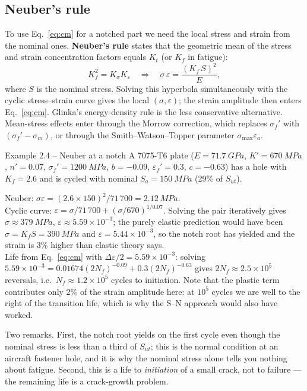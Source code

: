 \documentclass[11pt,a4paper]{article}
\begin{document}
\subsection{Neuber's rule}
To use Eq.~\eqref{eq:cm} for a notched part we need the local stress and strain from the nominal ones. \textbf{Neuber's rule} states that the geometric mean of the stress and strain concentration factors equals $K_t$ (or $K_f$ in fatigue):
\begin{equation}
  K_f^{2}=K_\sigma K_\varepsilon \quad\Longrightarrow\quad
  \sigma\,\varepsilon=\frac{(K_f\,S)^{2}}{E},
\end{equation}
where $S$ is the nominal stress. Solving this hyperbola simultaneously with the cyclic stress--strain curve gives the local $(\sigma,\varepsilon)$; the strain amplitude then enters Eq.~\eqref{eq:cm}. Glinka's energy-density rule is the less conservative alternative. Mean-stress effects enter through the Morrow correction, which replaces $\sigma_f'$ with $(\sigma_f'-\sigma_m)$, or through the Smith--Watson--Topper parameter $\sigma_{\max}\varepsilon_a$.

\begin{examplebox}{Example 2.4 -- Neuber at a notch}
A 7075-T6 plate ($E=\SI{71.7}{GPa}$, $K'=\SI{670}{MPa}$, $n'=0.07$, $\sigma_f'=\SI{1200}{MPa}$, $b=-0.09$, $\varepsilon_f'=0.3$, $c=-0.63$) has a hole with $K_f=2.6$ and is cycled with nominal $S_a=\SI{150}{MPa}$ (29\% of $S_{ut}$).

Neuber: $\sigma\varepsilon=(2.6\times150)^{2}/71\,700=\SI{2.12}{MPa}$.\\
Cyclic curve: $\varepsilon=\sigma/71\,700+(\sigma/670)^{1/0.07}$. Solving the pair iteratively gives $\sigma\approx\SI{379}{MPa}$, $\varepsilon\approx5.59\times10^{-3}$; the purely elastic prediction would have been $\sigma=K_fS=\SI{390}{MPa}$ and $\varepsilon=5.44\times10^{-3}$, so the notch root has yielded and the strain is 3\% higher than elastic theory says.\\
Life from Eq.~\eqref{eq:cm} with $\Delta\varepsilon/2=5.59\times10^{-3}$: solving $5.59\times10^{-3}=0.01674(2N_f)^{-0.09}+0.3(2N_f)^{-0.63}$ gives $2N_f\approx2.5\times10^{5}$ reversals, i.e.\ $N_f\approx1.2\times10^{5}$ cycles to initiation. Note that the plastic term contributes only 2\% of the strain amplitude here: at $10^{5}$ cycles we are well to the right of the transition life, which is why the S--N approach would also have worked.

Two remarks. First, the notch root yields on the first cycle even though the nominal stress is less than a third of $S_{ut}$; this is the normal condition at an aircraft fastener hole, and it is why the nominal stress alone tells you nothing about fatigue. Second, this is a life to \emph{initiation} of a small crack, not to failure --- the remaining life is a crack-growth problem.
\end{examplebox}
\end{document}
